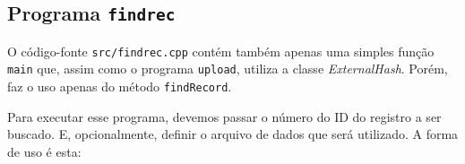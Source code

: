 \subsection{Programa \texttt{findrec}}\label{subsec:programa_findrec}

O código-fonte \texttt{src/findrec.cpp} contém também apenas uma simples função \texttt{main} que, assim como o programa \texttt{upload}, utiliza a classe \emph{ExternalHash}. Porém, faz o uso apenas do método \texttt{findRecord}. 

Para executar esse programa, devemos passar o número do ID do registro a ser buscado. E, opcionalmente, definir o arquivo de dados que será utilizado.
A forma de uso é esta:
